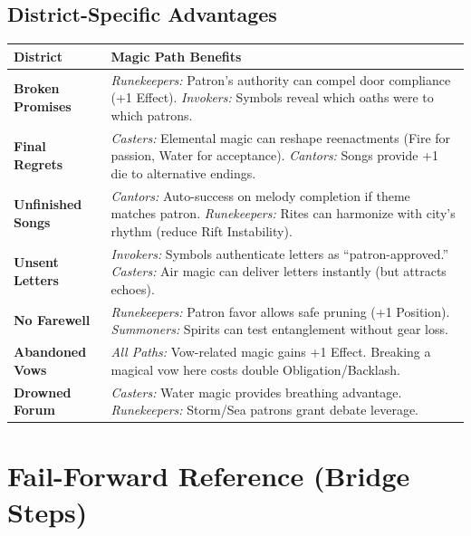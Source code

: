\documentclass[11pt]{article}
\begin{document}
\subsection*{District-Specific Advantages}
\begin{tabularx}{\linewidth}{@{}l X@{}}
\toprule
\textbf{District} & \textbf{Magic Path Benefits}\\
\midrule
\textbf{Broken Promises} & \textit{Runekeepers:} Patron's authority can compel door compliance (+1 Effect). \textit{Invokers:} Symbols reveal which oaths were to which patrons.\\
\textbf{Final Regrets} & \textit{Casters:} Elemental magic can reshape reenactments (Fire for passion, Water for acceptance). \textit{Cantors:} Songs provide +1 die to alternative endings.\\
\textbf{Unfinished Songs} & \textit{Cantors:} Auto-success on melody completion if theme matches patron. \textit{Runekeepers:} Rites can harmonize with city's rhythm (reduce Rift Instability).\\
\textbf{Unsent Letters} & \textit{Invokers:} Symbols authenticate letters as ``patron-approved.'' \textit{Casters:} Air magic can deliver letters instantly (but attracts echoes).\\
\textbf{No Farewell} & \textit{Runekeepers:} Patron favor allows safe pruning (+1 Position). \textit{Summoners:} Spirits can test entanglement without gear loss.\\
\textbf{Abandoned Vows} & \textit{All Paths:} Vow-related magic gains +1 Effect. Breaking a magical vow here costs double Obligation/Backlash.\\
\textbf{Drowned Forum} & \textit{Casters:} Water magic provides breathing advantage. \textit{Runekeepers:} Storm/Sea patrons grant debate leverage.\\
\bottomrule
\end{tabularx}

\section{Fail-Forward Reference (Bridge Steps)}
\label{app:fail-forward}
\end{document}

